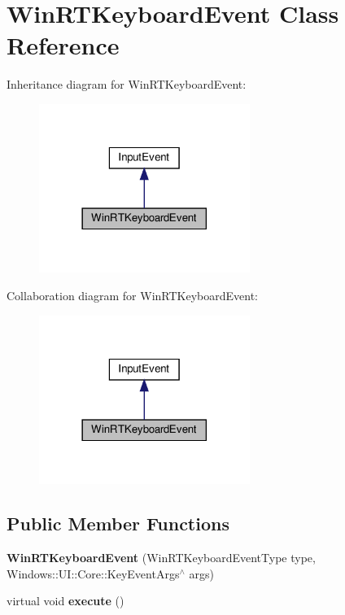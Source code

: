 \hypertarget{classWinRTKeyboardEvent}{}\section{Win\+R\+T\+Keyboard\+Event Class Reference}
\label{classWinRTKeyboardEvent}


Inheritance diagram for Win\+R\+T\+Keyboard\+Event\+:
\nopagebreak
\begin{figure}[H]
\begin{center}
\leavevmode
\includegraphics[width=194pt]{classWinRTKeyboardEvent__inherit__graph}
\end{center}
\end{figure}


Collaboration diagram for Win\+R\+T\+Keyboard\+Event\+:
\nopagebreak
\begin{figure}[H]
\begin{center}
\leavevmode
\includegraphics[width=194pt]{classWinRTKeyboardEvent__coll__graph}
\end{center}
\end{figure}
\subsection*{Public Member Functions}
\begin{DoxyCompactItemize}
\item 
\mbox{\label{classWinRTKeyboardEvent_a5983e09d0989beac4ecd0ad9a81ec4ca}} 
{\bfseries Win\+R\+T\+Keyboard\+Event} (Win\+R\+T\+Keyboard\+Event\+Type type, Windows\+::\+U\+I\+::\+Core\+::\+Key\+Event\+Args$^\wedge$ args)
\item 
\mbox{\label{classWinRTKeyboardEvent_a9c491bfbedfb2a6237c394d2f04a73db}} 
virtual void {\bfseries execute} ()
\end{DoxyCompactItemize}


